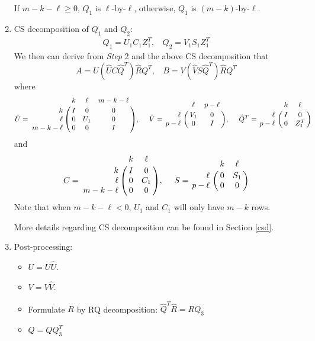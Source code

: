\begin{enumerate}
            If $m-k-\ell \geq 0$, $Q_1$ is $\ell$-by-$\ell$, otherwise, $Q_1$ is $(m-k)$-by-$\ell$.
        
        \item CS decomposition of $Q_1$ and $Q_2$:
            \begin{align}
                Q_1 = U_1C_1Z_1^{T}, \ \ \ \ Q_2 = V_1S_1Z_1^{T}
            \end{align}
            We then can derive from \textit{Step} 2 and the above CS decomposition that 
            \begin{equation} \label{eq-alg-3}
                A = U(\hat{U}C\hat{Q}^{T})\hat{R}Q^{T}, \ \ \ \ B = V(\hat{V}S\hat{Q}^{T})\hat{R}Q^{T}
            \end{equation}
            where
            \begin{displaymath}
                \hat{U} = \bordermatrix{ & k & \ell & m-k-\ell\cr
                \hfill k & I & 0 & 0\cr
                \hfill \ell & 0 & U_1 & 0\cr
                \hfill m-k-\ell & 0 & 0 & I}, \  \ \ \
                \hat{V} = \bordermatrix{ & \ell & p-\ell   \cr
                \hfill \ell & V_1 & 0\cr
                \hfill p-\ell & 0 & I}, \ \ \ \
                \hat{Q}^{T} = \bordermatrix{ & k & \ell   \cr
                \hfill \ell & I & 0\cr
                \hfill p-\ell & 0 & Z_1^{T}}
            \end{displaymath}
            and 
            \begin{displaymath}
                C = \bordermatrix{ & k & \ell \cr
                \hfill k & I & 0 \cr
                \hfill \ell & 0 & C_1 \cr
                \hfill m-k-\ell & 0 & 0}, \  \ \ \
                S = \bordermatrix{ & k & \ell   \cr
                \hfill \ell & 0 & S_1\cr
                \hfill p-\ell & 0 & 0}
            \end{displaymath}
            Note that when $m-k-\ell < 0$, $U_1$ and $C_1$ will only have $m-k$ rows.
        
        More details regarding CS decomposition can be found in Section \ref{csd}. 
        
        \item Post-processing:
            \begin{itemize}
                \item $U = U \hat{U}$.
                \item $V = V \hat{V}$.
                \item Formulate $R$ by RQ decomposition: $\hat{Q}^{T}\hat{R} = RQ_{3}$ 
                \item $Q = Q Q_{3}^{T}$
            \end{itemize}
    \end{enumerate}
    
